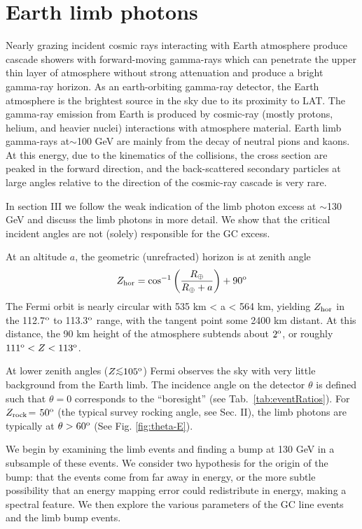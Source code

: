 \documentclass[aps,twocolumn,prd,superscriptaddress,showpacs,nofootinbib,fixfloat]{revtex4}
\newcommand{\be}{\begin{equation}}
\newcommand{\ee}{\end{equation}}
\newcommand{\degree}{^{\rm o}}
\newcommand{\zrock}{$Z_{\rm rock}$}
\def\la{\vcenter{\hbox{$<$}\offinterlineskip\hbox{$\sim$}}}
\begin{document}
\section{Earth limb photons}
\label{sec:EarthLimb}

Nearly grazing incident cosmic rays interacting with Earth
atmosphere produce cascade showers with forward-moving
gamma-rays which can penetrate the upper thin layer of
atmosphere without strong attenuation and produce a bright
gamma-ray horizon. As an earth-orbiting gamma-ray detector,
the Earth atmosphere is the brightest source in the sky due
to its proximity to LAT. The gamma-ray emission from Earth
is produced by cosmic-ray (mostly protons, helium, and
heavier nuclei) interactions with atmosphere material. Earth
limb gamma-rays at$\sim$100 GeV are mainly from the decay of
neutral pions and kaons. At this energy, due to the
kinematics of the collisions, the cross section are peaked
in the forward direction, and the back-scattered secondary
particles at large angles relative to the direction of the
cosmic-ray cascade is very rare.

In section III we follow the weak indication of the limb
photon excess at $\sim$130 GeV and discuss the limb photons
in more detail. We show that the critical incident angles
are not (solely) responsible for the GC excess.

At an altitude $a$, the geometric (unrefracted) horizon is
at zenith angle \be Z_{\rm hor} =
\cos^{-1}\left(\frac{R_\oplus}{R_\oplus+a}\right)+90\degree
\ee The Fermi orbit is nearly circular with 535 km < a <
564 km, yielding $Z_{\rm hor}$ in the 112.7$\degree$ to
113.3$\degree$ range, with the tangent point some 2400 km
distant.  At this distance, the 90 km height of the
atmosphere subtends about $2\degree$, or roughly $111\degree
< Z < 113\degree$.

At lower zenith angles ($Z \la 105\degree$) Fermi observes
the sky with very little background from the Earth limb.  The
incidence angle on the detector $\theta$ is defined such
that $\theta=0$ corresponds to the ``boresight'' (see
Tab.~\ref{tab:eventRatios}).  For \zrock = $50\degree$ (the
typical survey rocking angle, see Sec. II), the limb photons
are typically at $\theta > 60\degree$ (See
Fig. \ref{fig:theta-E}).


We begin by examining the limb events and finding a bump at
130 GeV in a subsample of these events.  We consider two
hypothesis for the origin of the bump: that the events come
from far away in energy, or the more subtle possibility that
an energy mapping error could redistribute in energy, making
a spectral feature.  We then explore the various parameters
of the GC line events and the limb bump events.
\end{document}

